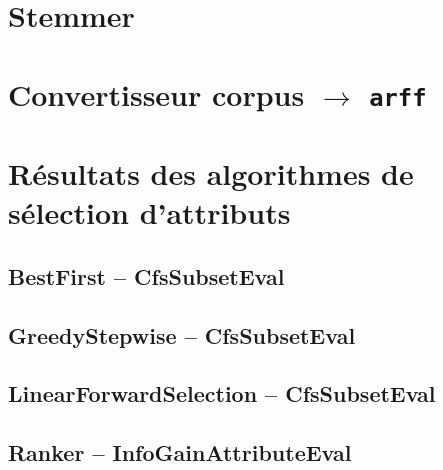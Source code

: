 \section{Stemmer}


\section{Convertisseur corpus $\rightarrow$ \texttt{arff}}


\section{Résultats des algorithmes de sélection d'attributs}
\subsection{BestFirst -- CfsSubsetEval}


\subsection{GreedyStepwise -- CfsSubsetEval}


\subsection{LinearForwardSelection -- CfsSubsetEval}


\subsection{Ranker -- InfoGainAttributeEval}
